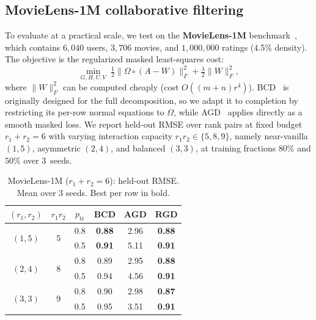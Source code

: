 \documentclass[letterpaper, 10 pt, conference]{ieeeconf}
\newcommand{\Had}{\circ}
\theoremstyle{plain}
\theoremstyle{definition}
\theoremstyle{remark}
\newcommand{\BMorig}[1]{{#1}}%
\begin{document}
\subsection{MovieLens-1M collaborative filtering}
\label{sec:exp_movielens}

To evaluate at a practical scale, we test on the \textbf{MovieLens-1M} benchmark~\cite{harper2015movielens}, which contains $6{,}040$ users, $3{,}706$ movies, and $1{,}000{,}000$ ratings (4.5\% density).
The objective is the regularized masked least-squares cost:
\begin{equation*}
  \min_{G,H,U,V}\; \tfrac{1}{2}\|\Omega\Had(A - W)\|_F^2 + \tfrac{\lambda}{2}\|W\|_F^2,
\end{equation*}
where $\|W\|_F^2$ can be computed cheaply (cost $O((m{+}n)r^4)$).
BCD~\cite{wertz2024bcd} is originally designed for the full decomposition, so we adapt it to completion by restricting its per-row normal equations to $\Omega$, while AGD~\cite{ciaperoni2024hadamard} applies directly as a smooth masked loss. We report held-out RMSE over rank pairs at fixed budget $r_1{+}r_2{=}6$ with varying interaction capacity $r_1 r_2\in\{5,8,9\}$, namely near-vanilla $(1,5)$, asymmetric $(2,4)$, and balanced $(3,3)$, at training fractions $80\%$ and $50\%$ over 3~seeds.

\begin{table}[t]
\centering
\caption{MovieLens-1M ($r_1{+}r_2{=}6$): held-out RMSE.
Mean over 3 seeds.  Best per row in bold.}
\label{tab:budget}
\small
\begin{tabular}{@{}c c c c c c@{}}
\toprule
$(r_1,r_2)$ & $r_1 r_2$ & $p_{\mathrm{tr}}$ & BCD & AGD & RGD \\
\midrule
\multirow{2}{*}{$(1,5)$} & \multirow{2}{*}{5}
  & 0.8 & \BMorig{\textbf{0.88}} & 2.96 & \textbf{0.88} \\
  & & 0.5 & \BMorig{\textbf{0.91}} & 5.11 & \textbf{0.91} \\
\midrule
\multirow{2}{*}{$(2,4)$} & \multirow{2}{*}{8}
  & 0.8 & 0.89 & 2.95 & \textbf{0.88} \\
  & & 0.5 & 0.94 & 4.56 & \textbf{0.91} \\
\midrule
\multirow{2}{*}{$(3,3)$} & \multirow{2}{*}{9}
  & 0.8 & 0.90 & 2.98 & \textbf{0.87} \\
  & & 0.5 & 0.95 & 3.51 & \textbf{0.91} \\
\bottomrule
\end{tabular}
\end{table}
\end{document}
